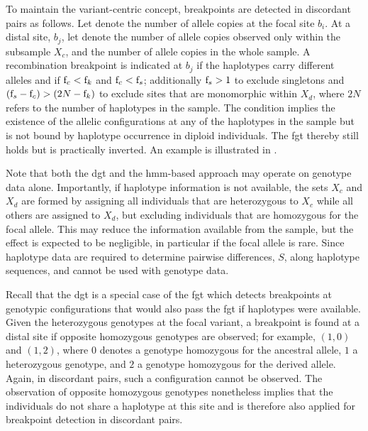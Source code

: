 To maintain the variant-centric concept, breakpoints are detected in discordant pairs as follows.
Let \fk{} denote the number of allele copies at the focal site $b_i$.
At a distal site, $b_j$, let  denote the number of allele copies observed only within the subsample $X_c$, and  the number of allele copies in the whole sample.
A recombination breakpoint is indicated at $b_j$ if the  haplotypes carry different alleles and if ${\fk{c} < \fk{}}$ and ${\fk{c} < \fk{s}}$; additionally ${\fk{s} > 1}$ to exclude singletons and ${(\fk{s} - \fk{c}) > (2N - \fk{})}$ to exclude sites that are monomorphic within $X_d$, where $2N$ refers to the number of haplotypes in the sample.
The condition implies the existence of the  allelic configurations at any of the haplotypes in the sample but is not bound by haplotype occurrence in  diploid individuals.
The \gls{fgt} thereby still holds but is practically inverted.
An example is illustrated in .

Note that both the \gls{dgt} and the \gls{hmm}-based approach may operate on genotype data alone.
Importantly, if haplotype information is not available, the sets $X_c$ and $X_d$ are formed by assigning all individuals that are heterozygous to $X_c$ while all others are assigned to $X_d$, but excluding individuals that are homozygous for the focal allele.
This may reduce the information available from the sample, but the effect is expected to be negligible, in particular if the focal allele is rare.
Since haplotype data are required to determine pairwise differences, $S$, along haplotype sequences, \ClockM and \ClockC cannot be used with genotype data.

Recall that the \gls{dgt} is a special case of the \gls{fgt} which detects breakpoints at genotypic configurations that would also pass the \gls{fgt} if haplotypes were available.
Given the  heterozygous genotypes at the focal variant, a breakpoint is found at a distal site if opposite homozygous genotypes are observed; for example, ${(1,0)}$ and ${(1,2)}$, where $0$ denotes a genotype homozygous for the ancestral allele, $1$ a heterozygous genotype, and $2$ a genotype homozygous for the derived allele.
Again, in discordant pairs, such a configuration cannot be observed.
The observation of opposite homozygous genotypes nonetheless implies that the  individuals do not share a haplotype at this site and is therefore also applied for breakpoint detection in discordant pairs.

%

%

